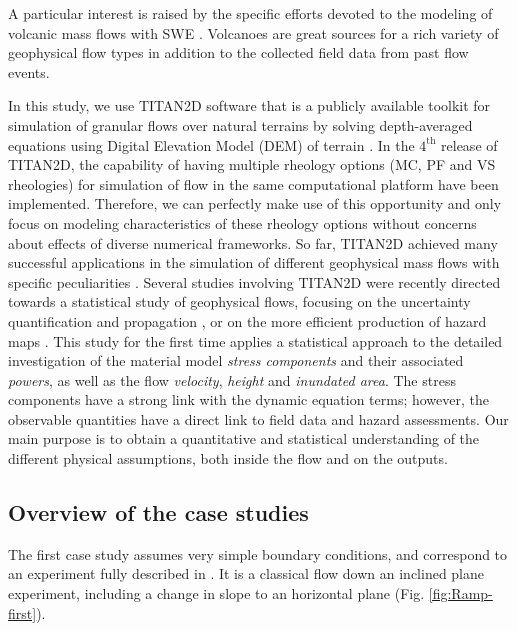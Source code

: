 \documentclass{article}
\begin{document}
A particular interest is raised by the specific efforts devoted to the modeling of volcanic mass flows with SWE \citep{FreundtBursik1998,Bursik2005,Saucedo2005, Kelfoun2005,Charbonnier2009,Kelfoun2009,Procter2010,Sulpizio2010,Kelfoun2011,Charbonnier2013}. Volcanoes are great sources for a rich variety of geophysical flow types in addition to the collected field data from past flow events.

In this study, we use TITAN2D software that is a publicly available toolkit for simulation of granular flows over natural terrains by solving depth-averaged equations using Digital Elevation Model (DEM) of terrain \citep{Pitman2003a, Patra2005, Patra2006, Yu2009, Aghakhani2016}. In the $\mathrm{4^{th}}$ release of TITAN2D, the capability of having multiple rheology options (MC, PF and VS rheologies) for simulation of flow in the same computational platform have been implemented. Therefore, we can perfectly make use of this opportunity and only focus on modeling characteristics of these rheology options without concerns about effects of diverse numerical frameworks. So far, TITAN2D achieved many successful applications in the simulation of different geophysical mass flows with specific peculiarities \citep{Sheridan2005, Rupp2006, Norini2008, Charbonnier2009, Procter2010, Sheridan2010, Sulpizio2010, Capra2011}. Several studies involving TITAN2D were recently directed towards a statistical study of geophysical flows, focusing on the uncertainty quantification and propagation \citep{Dalbey2008, Dalbey2009, Stefanescu2012a, Stefanescu2012b}, or on the more efficient production of hazard maps \citep{Bayarri2009, Spiller2014,Bayarri2015, Ogburn2016}. This study for the first time applies a statistical approach to the detailed investigation of the material model \emph{stress components} and their associated \emph{powers}, as well as the flow \emph{velocity}, \emph{height} and \emph{inundated area}. The stress components have a strong link with the dynamic equation terms; however, the observable quantities have a direct link to field data and hazard assessments. Our main purpose is to obtain a quantitative and statistical understanding of the different physical assumptions, both inside the flow and on the outputs.

\subsection{Overview of the case studies}
The first case study assumes very simple boundary conditions, and correspond to an experiment fully described in \cite{Webb2004, Bursik2005, WebbBursik2016}. It is a classical flow down an inclined plane experiment, including a change in slope to an horizontal plane (Fig. \ref{fig:Ramp-first}).
\end{document}
